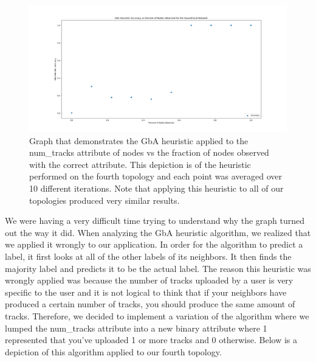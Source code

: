 \documentclass{article}
\begin{document}
\begin{figure}[h]
	\centering
	\includegraphics[scale=0.29]{take_4_gba}
	\caption{Graph that demonstrates the GbA heuristic applied to the num\_tracks attribute of nodes vs the fraction of nodes observed with the correct attribute.  This depiction is of the heuristic performed on the fourth topology and each point was averaged over 10 different iterations.  Note that applying this heuristic to all of our topologies produced very similar results.}
\end{figure}

We were having a very difficult time trying to understand why the graph turned out the way it did.  When analyzing the GbA heuristic algorithm, we realized that we applied it wrongly to our application.  In order for the algorithm to predict a label, it first looks at all of the other labels of its neighbors.  It then finds the majority label and predicts it to be the actual label.  The reason this heuristic was wrongly applied was because the number of tracks uploaded by a user is very specific to the user and it is not logical to think that if your neighbors have produced a certain number of tracks, you should produce the same amount of tracks.  Therefore, we decided to implement a variation of the algorithm where we lumped the num\_tracks attribute into a new binary attribute where 1 represented that you've uploaded 1 or more tracks and 0 otherwise.  Below is a depiction of this algorithm applied to our fourth topology.
\end{document}
